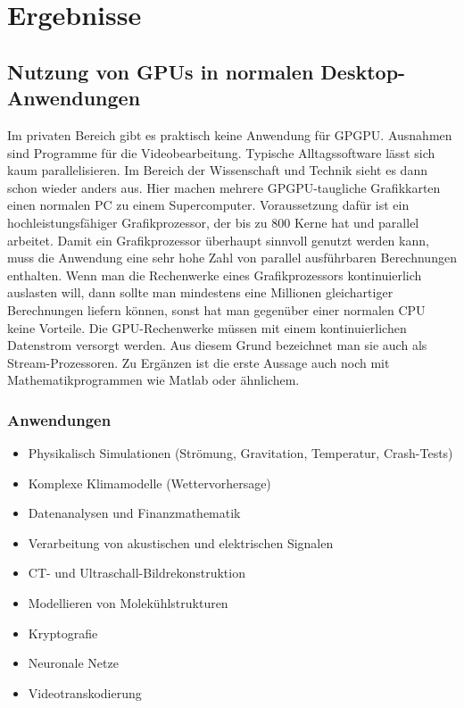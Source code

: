 
\section{Ergebnisse}
\label{sec:Ergebnisse}


\subsection{Nutzung von GPUs in normalen Desktop-Anwendungen}
\label{sec:Nutzung von GPUs in normalen Desktop-Anwendungen}
Im privaten Bereich gibt es praktisch keine Anwendung für GPGPU. Ausnahmen sind Programme für die Videobearbeitung. Typische Alltagssoftware lässt sich kaum parallelisieren. Im Bereich der Wissenschaft und Technik sieht es dann schon wieder anders aus. Hier machen mehrere GPGPU-taugliche Grafikkarten einen normalen PC zu einem Supercomputer.
Voraussetzung dafür ist ein hochleistungsfähiger Grafikprozessor, der bis zu 800 Kerne hat und parallel arbeitet. Damit ein Grafikprozessor überhaupt sinnvoll genutzt werden kann, muss die Anwendung eine sehr hohe Zahl von parallel ausführbaren Berechnungen enthalten. Wenn man die Rechenwerke eines Grafikprozessors kontinuierlich auslasten will, dann sollte man mindestens eine Millionen gleichartiger Berechnungen liefern können, sonst hat man gegenüber einer normalen CPU keine Vorteile. Die GPU-Rechenwerke müssen mit einem kontinuierlichen Datenstrom versorgt werden. Aus diesem Grund bezeichnet man sie auch als Stream-Prozessoren. \cite{elektronik_gpgpu}
Zu Ergänzen ist die erste Aussage auch noch mit Mathematikprogrammen wie Matlab oder ähnlichem.
\cite{matlab}

\subsubsection{Anwendungen}
\label{sec:Anwendungen}
\begin{itemize}
\item Physikalisch Simulationen (Strömung, Gravitation, Temperatur, Crash-Tests)
\item Komplexe Klimamodelle (Wettervorhersage)
\item Datenanalysen und Finanzmathematik
\item Verarbeitung von akustischen und elektrischen Signalen
\item CT- und Ultraschall-Bildrekonstruktion
\item Modellieren von Molekühlstrukturen
\item Kryptografie
\item Neuronale Netze
\item Videotranskodierung
\end{itemize}

